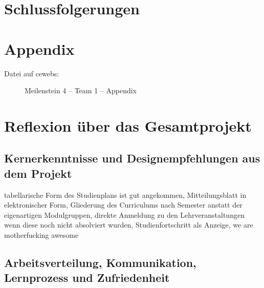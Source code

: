 \documentclass[a4paper,10pt]{scrartcl}
\begin{document}
\section{Schlussfolgerungen}


\section{Appendix}

\begin{description}
 \item[Datei auf cewebs:] Meilenstein 4 -- Team 1 -- Appendix
\end{description}

\section{Reflexion über das Gesamtprojekt}

\subsection{Kernerkenntnisse und Designempfehlungen aus dem Projekt}

% 

tabellarische Form des Studienplans ist gut angekommen, Mitteilungsblatt in elektronischer Form, Gliederung des Curriculums nach Semester anstatt der eigenartigen
Modulgruppen, direkte Anmeldung zu den Lehrveranstaltungen wenn diese noch nicht absolviert wurden, Studienfortschritt als Anzeige, we are motherfucking awesome

\subsection{Arbeitsverteilung, Kommunikation, Lernprozess und Zufriedenheit}


\end{document}
